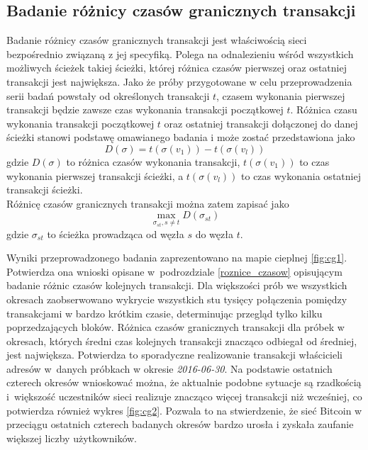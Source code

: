 \documentclass[12pt, twoside, final, openany]{mgr}
\begin{document}
\subsection{Badanie różnicy czasów granicznych transakcji}
\label{graniczne_transakcje}
\indent Badanie różnicy czasów granicznych transakcji jest właściwością sieci bezpośrednio związaną z jej specyfiką. Polega na odnalezieniu wśród wszystkich możliwych ścieżek takiej ścieżki, której różnica czasów pierwszej oraz ostatniej transakcji jest największa. Jako że próby przygotowane w celu przeprowadzenia serii badań powstały od określonych transakcji $t$, czasem wykonania pierwszej transakcji będzie zawsze czas wykonania transakcji początkowej $t$. Różnica czasu wykonania transakcji początkowej $t$ oraz ostatniej transakcji dołączonej do danej ścieżki stanowi podstawę omawianego badania i może zostać przedstawiona jako
\begin{equation}
D(\sigma) = t(\sigma(v_1)) - t(\sigma(v_l))
\end{equation}
gdzie $D(\sigma)$ to różnica czasów wykonania transakcji, $t(\sigma(v_1))$ to czas wykonania pierwszej transakcji ścieżki, a $t(\sigma(v_l))$ to czas wykonania ostatniej transakcji ścieżki.
\\ Różnicę czasów granicznych transakcji można zatem zapisać jako
\begin{equation}
 \max_{\sigma_{st},s \ne t} D(\sigma_{st})
\end{equation}
gdzie $\sigma_{st}$ to ścieżka prowadząca od węzła $s$ do węzła $t$.

\indent Wyniki przeprowadzonego badania zaprezentowano na mapie cieplnej \ref{fig:cg1}. Potwierdza ona wnioski opisane w~podrozdziale \ref{roznice_czasow} opisującym badanie różnic czasów kolejnych transakcji. Dla większości prób we wszystkich okresach zaobserwowano wykrycie wszystkich stu tysięcy połączenia pomiędzy transakcjami w bardzo krótkim czasie, determinując przegląd tylko kilku poprzedzających bloków. Różnica czasów granicznych transakcji dla próbek w okresach, których średni czas kolejnych transakcji znacząco odbiegał od średniej, jest największa. Potwierdza to sporadyczne realizowanie transakcji właścicieli adresów w~danych próbkach w okresie \textit{2016-06-30}. Na podstawie ostatnich czterech okresów wnioskować można, że aktualnie podobne sytuacje są rzadkością i~większość uczestników sieci realizuje znacząco więcej transakcji niż wcześniej, co potwierdza również wykres \ref{fig:cg2}. Pozwala to na stwierdzenie, że sieć Bitcoin w przeciągu ostatnich czterech badanych okresów bardzo urosła i zyskała zaufanie większej liczby użytkowników.
\end{document}

